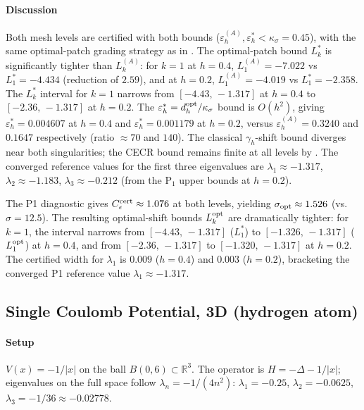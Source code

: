 \documentclass[11pt]{article}
\theoremstyle{plain}
\theoremstyle{definition}
\theoremstyle{remark}
\newcommand{\R}{\mathbb{R}}
\begin{document}
\paragraph{Discussion}
Both mesh levels are certified with both bounds
($\varepsilon_h^{(A)},\varepsilon_h^*<\kappa_\sigma=0.45$),
with the same optimal-patch grading strategy as in .
The optimal-patch bound $L_k^*$ is significantly tighter than $L_k^{(A)}$:
for $k=1$ at $h=0.4$, $L_1^{(A)}=-7.022$ vs $L_1^*=-4.434$ (reduction of $2.59$),
and at $h=0.2$, $L_1^{(A)}=-4.019$ vs $L_1^*=-2.358$.
The $L_k^*$ interval for $k=1$ narrows from $[-4.43,\,-1.317]$ at $h=0.4$
to $[-2.36,\,-1.317]$ at $h=0.2$.
The $\varepsilon_h^*=d_h^{\rm opt}/\kappa_\sigma$ bound is $O(h^2)$, giving
$\varepsilon_h^*=0.004607$ at $h=0.4$ and $\varepsilon_h^*=0.001179$ at $h=0.2$,
versus $\varepsilon_h^{(A)}=0.3240$ and $0.1647$ respectively (ratio $\approx70$ and $140$).
The classical $\gamma_h$-shift bound diverges near both singularities;
the CECR bound remains finite at all levels by .
The converged reference values for the first three eigenvalues are
$\lambda_1\approx-1.317$, $\lambda_2\approx-1.183$, $\lambda_3\approx-0.212$
(from the $\mathrm{P}_1$ upper bounds at $h=0.2$).

The P1 diagnostic gives $C_\epsilon^{\rm cert}\approx1.076$ at both levels,
yielding $\sigma_{\rm opt}\approx1.526$ (vs.\ $\sigma=12.5$).
The resulting optimal-shift bounds $L_k^{\rm opt}$ are dramatically tighter:
for $k=1$, the interval narrows from $[-4.43,\,-1.317]$ ($L_1^*$)
to $[-1.326,\,-1.317]$ ($L_1^{\rm opt}$) at $h=0.4$,
and from $[-2.36,\,-1.317]$ to $[-1.320,\,-1.317]$ at $h=0.2$.
The certified width for $\lambda_1$ is $0.009$ ($h=0.4$) and $0.003$ ($h=0.2$),
bracketing the converged P1 reference value $\lambda_1\approx-1.317$.

\subsection{Single Coulomb Potential, 3D (hydrogen atom)}
\label{subsec:num-coulomb-3d}

\paragraph{Setup}
$V(x) = -1/|x|$ on the ball $B(0,6)\subset\R^3$.
The operator is $H = -\Delta - 1/|x|$; eigenvalues on the full space
follow $\lambda_n = -1/(4n^2)$:
$\lambda_1 = -0.25$, $\lambda_2 = -0.0625$,
$\lambda_3 = -1/36 \approx -0.02778$.
\end{document}
